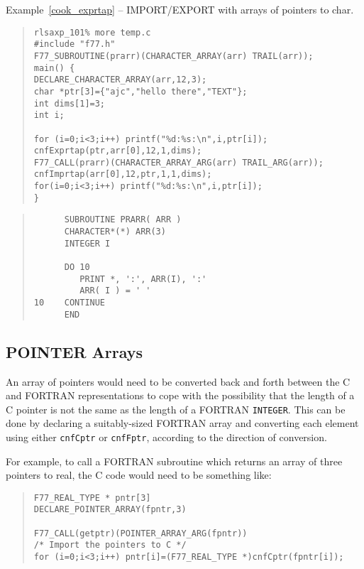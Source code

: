 \documentclass[twoside,11pt]{article}
\newcommand{\htmlref}[2]{#1}
\newcommand{\latex}[1]{#1}
\newcommand{\xlabel}[1]{}
\renewcommand{\_}{\texttt{\symbol{95}}}
\newcounter{examples}
\begin{document}
\label{cook_exprtap}
\begin{center}
Example\latex{~\ref{cook_exprtap}}
-- IMPORT/EXPORT with arrays of pointers to char.
\end{center}
{\small \begin{quote} \begin{verbatim}
rlsaxp_101% more temp.c
#include "f77.h"
F77_SUBROUTINE(prarr)(CHARACTER_ARRAY(arr) TRAIL(arr));
main() {
DECLARE_CHARACTER_ARRAY(arr,12,3);
char *ptr[3]={"ajc","hello there","TEXT"};
int dims[1]=3;
int i;

for (i=0;i<3;i++) printf("%d:%s:\n",i,ptr[i]);
cnfExprtap(ptr,arr[0],12,1,dims);
F77_CALL(prarr)(CHARACTER_ARRAY_ARG(arr) TRAIL_ARG(arr));
cnfImprtap(arr[0],12,ptr,1,1,dims);
for(i=0;i<3;i++) printf("%d:%s:\n",i,ptr[i]);
}
\end{verbatim} \end{quote} }
{\small \begin{quote} \begin{verbatim}
      SUBROUTINE PRARR( ARR )
      CHARACTER*(*) ARR(3)
      INTEGER I

      DO 10
         PRINT *, ':', ARR(I), ':'
         ARR( I ) = ' '
10    CONTINUE
      END
\end{verbatim} \end{quote} }

\subsection{\xlabel{pointer_arrays}POINTER Arrays}
An array of pointers would need to be converted back and forth between
the C and FORTRAN representations to cope with the possibility that
the length of a C pointer is not the same as the length of a FORTRAN
\texttt{INTEGER}. This can be done by declaring a suitably-sized
FORTRAN array and converting each element using either
\htmlref{\texttt{cnfCptr}}{cnfCptr}
or
\htmlref{\texttt{cnfFptr}}{cnfFptr},
according to the direction of conversion.

For example, to call a FORTRAN subroutine which returns an array of three
pointers to real, the C code would need to be something like:
{\small \begin{quote} \begin{verbatim}
F77_REAL_TYPE * pntr[3]
DECLARE_POINTER_ARRAY(fpntr,3)

F77_CALL(getptr)(POINTER_ARRAY_ARG(fpntr))
/* Import the pointers to C */
for (i=0;i<3;i++) pntr[i]=(F77_REAL_TYPE *)cnfCptr(fpntr[i]);
\end{verbatim} \end{quote} }
\end{document}
